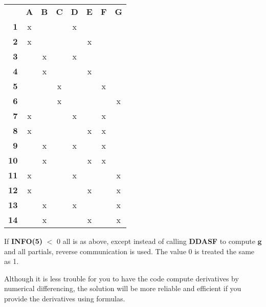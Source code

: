 \documentclass[twoside]{MATH77}
\begin{document}
\begin{description}
  \begin{tabular}{r*7{c}}
    & {\bf A} & {\bf B} & {\bf C} & {\bf D} & {\bf E} & {\bf F} & {\bf G}\\
    {\bf 1}  & x &   &   & x\\
    {\bf 2}  & x &   &   &   & x\\
    {\bf 3}  &   & x &   & x\\
    {\bf 4}  &   & x &   &   & x\\
    {\bf 5}  &   &   & x &   &   & x &\\ 
    {\bf 6}  &   &   & x &   &   &   & x\\ 
    {\bf 7}  & x &   &   & x &   & x\\
    {\bf 8}  & x &   &   &   & x & x\\
    {\bf 9}  &   & x &   & x &   & x\\
    {\bf 10} &   & x &   &   & x & x &\\
    {\bf 11} & x &   &   & x &   &   & x\\
    {\bf 12} & x &   &   &   & x &   & x\\
    {\bf 13} &   & x &   & x &   &   & x\\
    {\bf 14} &   & x &   &   & x &   & x\\
  \end{tabular}

  If \textbf{INFO(5)} $<$ 0 all is as above, except instead of calling
  \textbf{DDASF} to compute $\mathbf{g}$ and all partials, reverse communication
  is used.  The value 0 is treated the same as 1.

  Although it is less trouble for you to have the code compute derivatives by
  numerical differencing, the solution will be more reliable and efficient 
  if you provide the derivatives using formulas.


\end{description}
\end{document}
